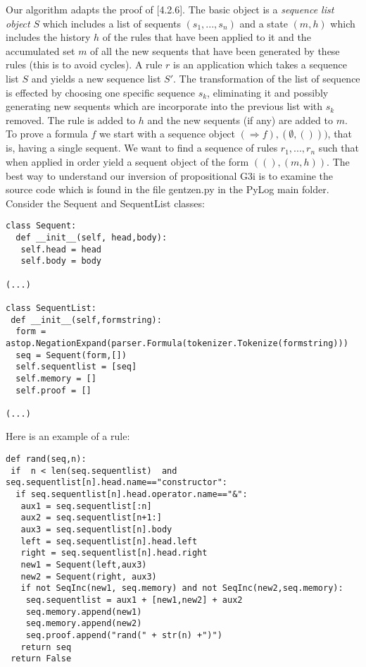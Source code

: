 \documentclass[a4paper,12pt,leqno]{article}
\numberwithin{equation}{section}
\begin{document}
Our algorithm adapts the proof of \cite{tro}[4.2.6]. The basic object is a \emph{sequence list object} $S$ which includes a list of sequents $(s_1,...,s_n)$  and a state $(m,h)$ which includes the history $h$ of the rules that have been applied to it and the accumulated set  $m$ of all the new sequents that have been generated by these rules (this is to avoid cycles). A rule $r$  is an application which takes a sequence list $S$ and yields a new sequence list $S'$. The transformation of the list of sequence is effected by choosing one specific sequence $s_k$, eliminating it and possibly generating new sequents  which are incorporate into the previous list with $s_k$ removed. The rule is added to $h$ and the new sequents (if any) are added to $m$.
To prove a formula $f$ we start with a sequence object $(\Rightarrow f), (\emptyset,()))$, that is, having a single sequent. We want to find a sequence of rules $r_1,...,r_n$ such that when applied in order yield a sequent object of the form $((), (m,h))$.
The best way to understand our inversion of propositional G3i is to examine the source code which is found in the file gentzen.py in the PyLog main folder. Consider the Sequent and SequentList classes:

\begin{verbatim}
class Sequent:
  def __init__(self, head,body):
   self.head = head
   self.body = body
   
(...)   

class SequentList:
 def __init__(self,formstring):
  form = astop.NegationExpand(parser.Formula(tokenizer.Tokenize(formstring)))
  seq = Sequent(form,[])
  self.sequentlist = [seq]
  self.memory = []
  self.proof = []

(...)
\end{verbatim}

Here is an example of a rule:

\begin{verbatim}
def rand(seq,n):
 if  n < len(seq.sequentlist)  and seq.sequentlist[n].head.name=="constructor":
  if seq.sequentlist[n].head.operator.name=="&":
   aux1 = seq.sequentlist[:n]
   aux2 = seq.sequentlist[n+1:]
   aux3 = seq.sequentlist[n].body
   left = seq.sequentlist[n].head.left
   right = seq.sequentlist[n].head.right
   new1 = Sequent(left,aux3)
   new2 = Sequent(right, aux3)
   if not SeqInc(new1, seq.memory) and not SeqInc(new2,seq.memory):
    seq.sequentlist = aux1 + [new1,new2] + aux2
    seq.memory.append(new1)
    seq.memory.append(new2)
    seq.proof.append("rand(" + str(n) +")")
   return seq
 return False
\end{verbatim}
\end{document}
